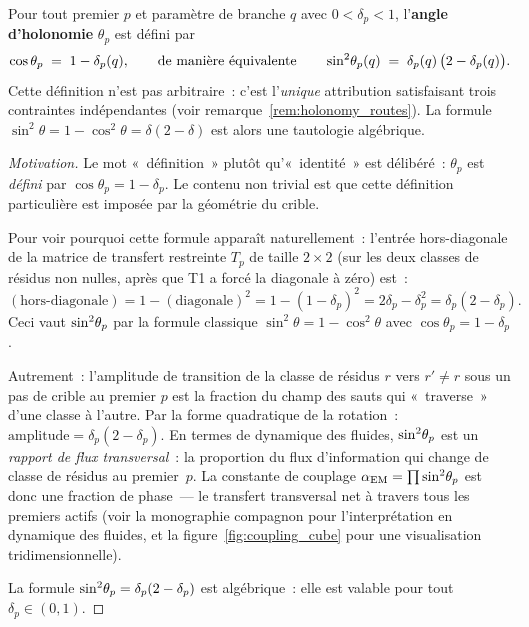 \documentclass[12pt,a4paper]{article}
\begin{document}
\begin{definition}
\label{def:holonomy}
Pour tout premier $p$ et paramètre de branche $q$ avec
$0 < \delta_p < 1$, l'\textbf{angle d'holonomie} $\theta_p$ est défini
par
\begin{equation}
  \cos\theta_p \;=\; 1 - \delta_p(q),
  \qquad\text{de manière équivalente}\qquad
  \sin^2\!\theta_{p}(q) \;=\; \delta_p(q)\,\bigl(2 - \delta_p(q)\bigr).
  \label{eq:holonomy}
\end{equation}
Cette définition n'est pas arbitraire~: c'est l'\emph{unique}
attribution satisfaisant trois contraintes indépendantes
(voir remarque~\ref{rem:holonomy_routes}).
La formule $\sin^2\theta = 1 - \cos^2\theta = \delta(2-\delta)$
est alors une tautologie algébrique.

\begin{proof}[Motivation]
Le mot «~définition~» plutôt qu'«~identité~» est délibéré~:
$\theta_p$ est \emph{défini} par $\cos\theta_p = 1 - \delta_p$.
Le contenu non trivial est que cette définition particulière est
imposée par la géométrie du crible.

Pour voir pourquoi cette formule apparaît naturellement~: l'entrée
hors-diagonale de la matrice de transfert restreinte $T_p$ de taille
$2 \times 2$ (sur les deux classes de résidus non nulles, après que T1
a forcé la diagonale à zéro) est~:
\[
  (\text{hors-diagonale}) = 1 - (\text{diagonale})^2 = 1 - (1 - \delta_p)^2
  = 2\delta_p - \delta_p^2 = \delta_p(2 - \delta_p).
\]
Ceci vaut $\sin^2\!\theta_{p}$ par la formule classique
$\sin^2\theta = 1 - \cos^2\theta$ avec
$\cos\theta_p = 1 - \delta_p$.

Autrement~: l'amplitude de transition de la classe de résidus $r$ vers
$r' \neq r$ sous un pas de crible au premier $p$ est la fraction du
champ des sauts qui «~traverse~» d'une classe à l'autre. Par la forme
quadratique de la rotation~:
$\text{amplitude} = \delta_p(2 - \delta_p)$.
En termes de dynamique des fluides, $\sin^2\!\theta_{p}$ est un
\emph{rapport de flux transversal}~: la proportion du flux
d'information qui change de classe de résidus au premier~$p$. La
constante de couplage $\alpha_{\mathrm{EM}} = \prod\sin^2\!\theta_{p}$ est donc une
fraction de phase~--- le transfert transversal net à travers tous les
premiers actifs (voir la monographie compagnon pour l'interprétation
en dynamique des fluides, et la
figure~\ref{fig:coupling_cube} pour une visualisation tridimensionnelle).

La formule $\sin^2\!\theta_{p} = \delta_p(2 - \delta_p)$ est algébrique~: elle
est valable pour tout $\delta_p \in (0,1)$.
\end{proof}
\end{definition}
\end{document}
